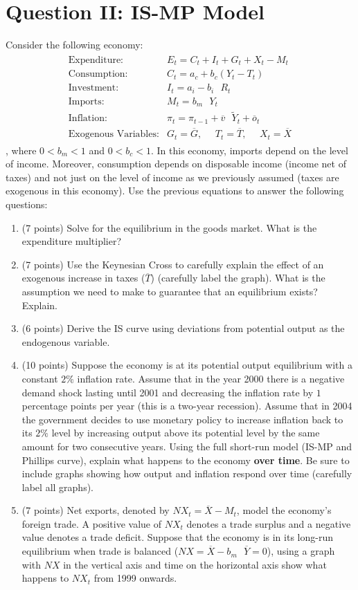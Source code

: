 \documentclass[letterpaper,12pt]{article}
\theoremstyle{dotlessS}
\begin{document}
\section*{Question II: IS-MP Model}
Consider the following economy:
\begin{eqnarray*}
\begin{array}{ll}
\text{Expenditure:} & E_t=C_t+I_t+G_t+X_t-M_t \\[1.4ex]
\text{Consumption:} &C_t=a_c+b_c (Y_t-T_t) \\[1.4ex]
\text{Investment:} & I_t=a_i -b_i \: \: \: R_t \\[1.4ex]
\text{Imports:} & M_t=b_m \: \: \: Y_t  \\[1.4ex]
\text{Inflation:} & \pi_t=\pi_{t-1}+\overline{v} \: \: \: \widetilde{Y}_t+\overline{o}_t  \\[1.4ex]
\text{Exogenous Variables:} & G_t=\overline{G}, \: \: \: \: \: \: T_t=\overline{T}, \: \: \: \: \: \: X_t=\overline{X}
\end{array}
\end{eqnarray*}
, where $0<b_m<1$ and $0<b_c<1$. In this economy, imports depend on the level of income. Moreover, consumption depends on disposable income (income net of taxes) and not just on the level of income as we previously assumed (taxes are exogenous in this economy). Use the previous equations to answer the following questions:
\begin{enumerate}[label=(\alph*)]
\item (7 points) Solve for the equilibrium in the goods market. What is the expenditure multiplier? 
\item (7 points) Use the Keynesian Cross to carefully explain the effect of an exogenous increase in taxes ($\overline{T}$) (carefully label the graph). What is the assumption we need to make to guarantee that an equilibrium exists? Explain.
\item (6 points) Derive the IS curve using deviations from potential output as the endogenous variable.
\item (10 points) Suppose the economy is at its potential output equilibrium with a constant $2\%$ inflation rate. Assume that in the year 2000 there is a negative demand shock lasting until 2001 and decreasing the inflation rate by $1$ percentage points per year (this is a two-year recession). Assume that in 2004 the government decides to use monetary policy to increase  inflation back to its $2\%$ level by increasing output above its potential level by the same amount for two consecutive years. Using the full short-run model (IS-MP and Phillips curve), explain what happens to the economy \textbf{over time}. Be sure to include graphs showing how output and inflation respond over time (carefully label all graphs).
\item (7 points) Net exports, denoted by $NX_t=\overline{X}-M_t$, model the economy's foreign trade. A positive value of $NX_t$ denotes a trade surplus and a negative value denotes a trade deficit. Suppose that the economy is in its long-run equilibrium when trade is balanced ($NX=\overline{X}-b_m \: \: \: \overline{Y}=0$), using a graph with $NX$ in the vertical axis and time on the horizontal axis show what happens to $NX_t$ from 1999 onwards.
\end{enumerate}   
\end{document}
